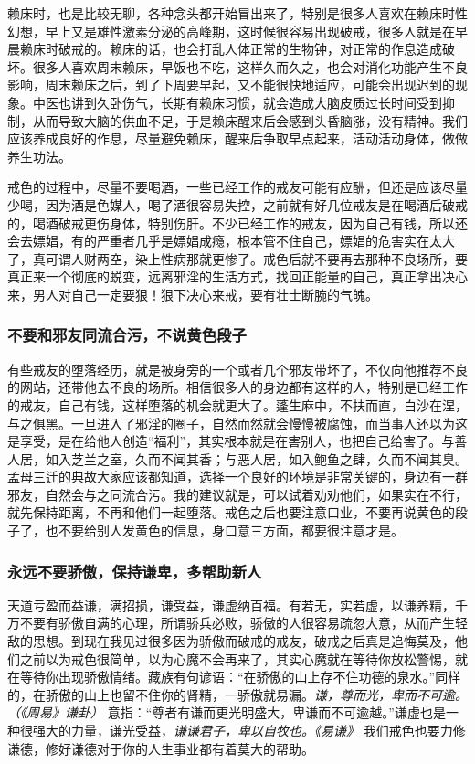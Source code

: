 赖床时，也是比较无聊，各种念头都开始冒出来了，特别是很多人喜欢在赖床时性幻想，早上又是雄性激素分泌的高峰期，这时候很容易出现破戒，很多人就是在早晨赖床时破戒的。赖床的话，也会打乱人体正常的生物钟，对正常的作息造成破坏。很多人喜欢周末赖床，早饭也不吃，这样久而久之，也会对消化功能产生不良影响，周末赖床之后，到了下周要早起，又不能很快地适应，可能会出现迟到的现象。中医也讲到久卧伤气，长期有赖床习惯，就会造成大脑皮质过长时间受到抑制，从而导致大脑的供血不足，于是赖床醒来后会感到头昏脑涨，没有精神。我们应该养成良好的作息，尽量避免赖床，醒来后争取早点起来，活动活动身体，做做养生功法。

戒色的过程中，尽量不要喝酒，一些已经工作的戒友可能有应酬，但还是应该尽量少喝，因为酒是色媒人，喝了酒很容易失控，之前就有好几位戒友是在喝酒后破戒的，喝酒破戒更伤身体，特别伤肝。不少已经工作的戒友，因为自己有钱，所以还会去嫖娼，有的严重者几乎是嫖娼成瘾，根本管不住自己，嫖娼的危害实在太大了，真可谓人财两空，染上性病那就更惨了。戒色后就不要再去那种不良场所，要真正来一个彻底的蜕变，远离邪淫的生活方式，找回正能量的自己，真正拿出决心来，男人对自己一定要狠！狠下决心来戒，要有壮士断腕的气魄。

\subsubsection{不要和邪友同流合污，不说黄色段子}

有些戒友的堕落经历，就是被身旁的一个或者几个邪友带坏了，不仅向他推荐不良的网站，还带他去不良的场所。相信很多人的身边都有这样的人，特别是已经工作的戒友，自己有钱，这样堕落的机会就更大了。蓬生麻中，不扶而直，白沙在涅，与之俱黑。一旦进入了邪淫的圈子，自然而然就会慢慢被腐蚀，而当事人还以为这是享受，是在给他人创造“福利”，其实根本就是在害别人，也把自己给害了。与善人居，如入芝兰之室，久而不闻其香；与恶人居，如入鲍鱼之肆，久而不闻其臭。孟母三迁的典故大家应该都知道，选择一个良好的环境是非常关键的，身边有一群邪友，自然会与之同流合污。我的建议就是，可以试着劝劝他们，如果实在不行，就先保持距离，不再和他们一起堕落。戒色之后也要注意口业，不要再说黄色的段子了，也不要给别人发黄色的信息，身口意三方面，都要很注意才是。

\subsubsection{永远不要骄傲，保持谦卑，多帮助新人}

天道亏盈而益谦，满招损，谦受益，谦虚纳百福。有若无，实若虚，以谦养精，千万不要有骄傲自满的心理，所谓骄兵必败，骄傲的人很容易疏忽大意，从而产生轻敌的思想。到现在我见过很多因为骄傲而破戒的戒友，破戒之后真是追悔莫及，他们之前以为戒色很简单，以为心魔不会再来了，其实心魔就在等待你放松警惕，就在等待你出现骄傲情绪。藏族有句谚语：“在骄傲的山上存不住功德的泉水。”同样的，在骄傲的山上也留不住你的肾精，一骄傲就易漏。\textit{谦，尊而光，卑而不可逾。（《周易》谦卦）} 意指：“尊者有谦而更光明盛大，卑谦而不可逾越。”谦虚也是一种很强大的力量，谦光受益，\textit{谦谦君子，卑以自牧也。《易谦》} 我们戒色也要力修谦德，修好谦德对于你的人生事业都有着莫大的帮助。

